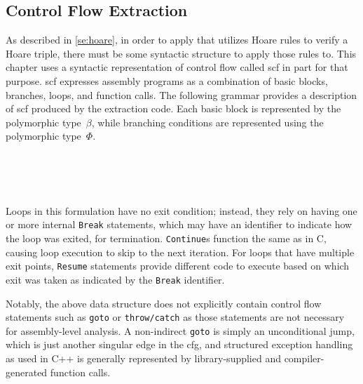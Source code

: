 \subsection{Control Flow Extraction}\label{sse:cfg_extract}
As described in \cref{se:hoare},
in order to apply  that utilizes Hoare rules to verify a Hoare triple,
there must be some syntactic structure to apply those rules to.
This chapter uses a syntactic representation of control flow called \ac{scf}
in part for that purpose.
\Ac{scf} expresses assembly programs as a combination of basic blocks,
branches, loops, and function calls.
The following grammar provides a description of \ac{scf}
produced by the extraction code.
Each basic block is represented by the polymorphic type~$\beta$,%
while branching conditions are represented using the polymorphic type~$\Phi$.%
\begin{bnf}
   \\
   \\
   \\
\end{bnf}
Loops in this formulation have no exit condition;%
instead, they rely on having one or more internal \texttt{Break} statements,%
which may have an identifier to indicate how the loop was exited, for termination.
\texttt{Continue}s function the same as in C,%
causing loop execution to skip to the next iteration.
For loops that have multiple exit points,
\texttt{Resume} statements provide different code to execute
based on which exit was taken as indicated by the \texttt{Break} identifier.

Notably, the above data structure does not explicitly contain
control flow statements such as \texttt{goto} or \texttt{throw/catch}
as those statements are not necessary for assembly-level analysis.
A non-indirect \texttt{goto} is simply an unconditional jump,
which is just another singular edge in the \ac{cfg},
and structured exception handling as used in C++ is generally represented
by library-supplied and compiler-generated function calls.

